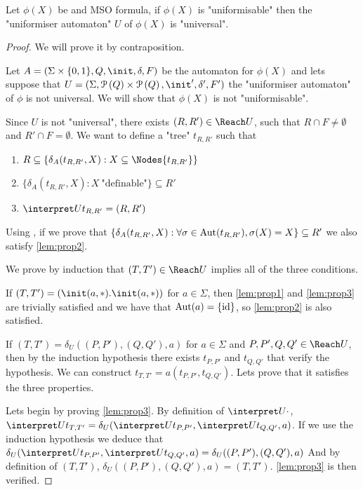 \documentclass[a4paper,UKenglish,cleveref, autoref, thm-restate]{lipics-v2021}
\begin{document}
\begin{lemma}
	Let $\phi(X)$ be and MSO formula, if $\phi(X)$ is "uniformisable" then the "uniformiser automaton" $U$ of $\phi(X)$ is "universal".
\end{lemma}

\begin{proof}
	We will prove it by contraposition.

	Let $A =  (\Sigma \times \{0,1\}, Q, \init, \delta, F)$ be the automaton for $\phi(X)$ and lets suppose that
	$U = (\Sigma, \parts Q \times \parts Q,\init', \delta', F')$ the "uniformiser automaton" of $\phi$ is not universal.
	We will show that $\phi(X)$ is not "uniformisable".

	Since $U$ is not "universal", there exists $(R,R') \in \Reach U$, such that $R \cap F \neq \emptyset$ and $R' \cap F = \emptyset$.
	We want to define a "tree" $t_{R,R'}$ such that
	\begin{enumerate}
		\item $R \subseteq \{ \delta_A (t_{R,R'},X) : X \subseteq \Nodes {t_{R,R'}}\}$ \label{lem:prop1}
		\item $\{ \delta_A (t_{R,R'},X) : X \ \text{"definable"}\} \subseteq R'$\label{lem:prop2}
		\item $\interpret U {t_{R,R'}} = (R,R')$\label{lem:prop3}
	\end{enumerate}

	Using , if we prove that $\{ \delta_A (t_{R,R'},X) : \forall \sigma \in \text{Aut}(t_{R,R'}), \sigma(X) = X\} \subseteq R'$ we also
	satisfy \ref{lem:prop2}.

	We prove by induction that $(T,T') \in \Reach U$ implies all of the three conditions.

	If $(T,T') = (\init(a,*). \init (a, *))$ for $a \in \Sigma$, then \ref{lem:prop1} and \ref{lem:prop3} are trivially satisfied and we have that
	$\text{Aut} (a) = \{\text{id}\}$, so \ref{lem:prop2} is also satisfied.

	If $(T,T') = \delta_U((P,P'),(Q,Q'),a)$ for $a \in \Sigma$ and $P,P',Q,Q' \in \Reach U$, then by the induction hypothesis there exists
	$t_{P,P'}$ and $t_{Q,Q'}$ that verify the hypothesis. We can construct $t_{T,T'} = a(t_{P,P'},t_{Q,Q'})$. Lets prove that it satisfies the
	three properties.

	Lets begin by proving \ref{lem:prop3}.
	By definition of $\interpret U {\cdot}$,
	$\interpret U {t_{T,T'}} = \delta_U (\interpret U {t_{P,P'}}, \interpret U {t_{Q,Q'}}, a)$.
	If we use the induction hypothesis we deduce that
	$\delta_U (\interpret U {t_{P,P'}}, \interpret U {t_{Q,Q'}}, a) = \delta_U ((P,P'), (Q,Q'), a)$
	And by definition of $(T,T')$, $\delta_U ((P,P'), (Q,Q'), a) = (T,T')$.
	\ref{lem:prop3} is then verified.


\end{proof}
\end{document}
